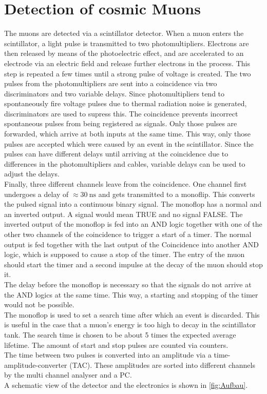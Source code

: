 \section{Detection of cosmic Muons}

The muons are detected via a scintillator detector. When a muon enters the scintillator, a light pulse is transmitted to two photomultipliers.
Electrons are then released by means of the photoelectric effect, 
and are accelerated to an electrode via an electric field and release further electrons in the process. This step is repeated a few times until a strong pulse of voltage is created.
The two pulses from the photomultipliers are sent into a coincidence via two discriminators and two variable delays. Since photomultipliers tend to spontaneously fire voltage pulses due to thermal radiation noise is generated, discriminators
are used to supress this. The coincidence prevents incorrect spontaneous pulses from being registered as signals. Only those pulses are forwarded, which arrive at both inputs at the same time.
This way, only those pulses are accepted which were caused by an event in the scintillator. Since the pulses can have different delays until arriving at the coincidence due to differences in the photomultipliers and cables, variable delays 
can be used to adjust the delays.\\
Finally, three different channels leave from the coincidence. One channel first undergoes a delay of $\approx \qty{30}{\nano\second}$ and gets transmitted to a monoflip. This converts the pulsed signal into a continuous binary signal.
The monoflop has a normal and an inverted output. A signal would mean TRUE and no signal FALSE. The inverted output of the monoflop is fed into an AND logic together with one of the other two channels of the coincidence to trigger a start of a timer.
The normal output is fed together with the last output of the Coincidence into another AND logic, which is supposed to cause a stop of the timer.
The entry of the muon should start the timer and a second impulse at the decay of the muon should stop it.\\
The delay before the monoflop is necessary so that the signals do not arrive at the AND logics at the same time. This way, a starting and stopping of the timer would not be possible.\\
The monoflop is used to set a search time after which an event is discarded. This is useful in the case that a muon's energy is too high to decay in the scintillator tank. 
The search time is chosen to be about 5 times the expected average lifetime. The amount of start and stop pulses are counted via counters.\\
The time between two pulses is converted into an amplitude via a time-amplitude-converter (TAC). These amplitudes are sorted into different channels by the multi channel analyser and a PC.\\
A schematic view of the detector and the electronics is shown in \autoref{fig:Aufbau}.

